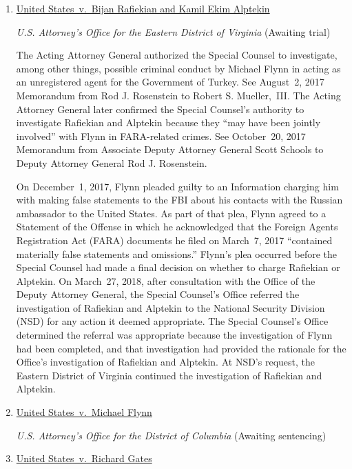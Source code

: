 \begin{enumerate}[1.]

\item \underline{United States~v.\ Bijan Rafiekian and Kamil Ekim Alptekin}

\textit{U.S. Attorney's Office for the Eastern District of Virginia}\hfil\break
(Awaiting trial)

The Acting Attorney General authorized the Special Counsel to investigate, among other things, possible criminal conduct by Michael Flynn in acting as an unregistered agent for the Government of Turkey.
See August~2, 2017 Memorandum from Rod J. Rosenstein to Robert S. Mueller,~III\null.
The Acting Attorney General later confirmed the Special Counsel's authority to investigate Rafiekian and Alptekin because they ``may have been jointly involved'' with Flynn in FARA-related crimes.
See October~20, 2017 Memorandum from Associate Deputy Attorney General Scott Schools to Deputy Attorney General Rod J. Rosenstein.

On December~1, 2017, Flynn pleaded guilty to an Information charging him with making false statements to the FBI about his contacts with the Russian ambassador to the United States.
As part of that plea, Flynn agreed to a Statement of the Offense in which he acknowledged that the Foreign Agents Registration Act (FARA) documents he filed on March~7, 2017 ``contained materially false statements and omissions.''
Flynn's plea occurred before the Special Counsel had made a final decision on whether to charge Rafiekian or Alptekin.
On March~27, 2018, after consultation with the Office of the Deputy Attorney General, the Special Counsel's Office referred the investigation of Rafiekian and Alptekin to the National Security Division (NSD) for any action it deemed appropriate.
The Special Counsel's Office determined the referral was appropriate because the investigation of Flynn had been completed, and that investigation had provided the rationale for the Office's investigation of Rafiekian and Alptekin.
At NSD's request, the Eastern District of Virginia continued the investigation of Rafiekian and Alptekin.

    \item \underline{United States~v.\ Michael Flynn}

\textit{U.S. Attorney's Office for the District of Columbia}\hfil\break
(Awaiting sentencing)

    \item \underline{United States~v.\ Richard Gates}


\end{enumerate}
